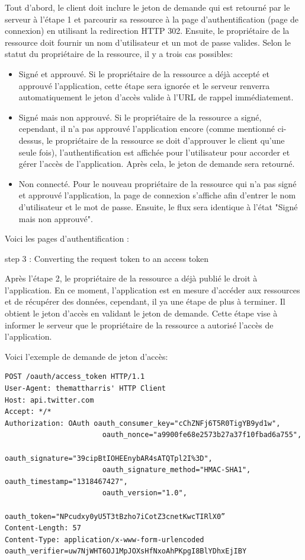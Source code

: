 Tout d'abord, le client doit inclure le jeton de demande qui est retourné par le serveur à l'étape 1 et parcourir sa ressource à la page d'authentification (page de connexion) en utilisant la redirection HTTP 302. Ensuite, le propriétaire de la ressource doit fournir un nom d'utilisateur et un mot de passe valides. Selon le statut du propriétaire de la ressource, il y a trois cas possibles:
\begin{itemize}
\item Signé et approuvé. Si le propriétaire de la ressource a déjà accepté et approuvé l'application, cette étape sera ignorée et le serveur renverra automatiquement le jeton d'accès valide à l'URL de rappel immédiatement.
\item Signé mais non approuvé. Si le propriétaire de la ressource a signé, cependant, il n'a pas approuvé l'application encore (comme mentionné ci-dessus, le propriétaire de la ressource se doit d'approuver le client qu'une seule fois), l'authentification est affichée pour l'utilisateur pour accorder et gérer l'accès de l'application. Après cela, le jeton de demande sera retourné.
\item Non connecté. Pour le nouveau propriétaire de la ressource qui n'a pas signé et approuvé l'application, la page de connexion s'affiche afin d'entrer le nom d'utilisateur et le mot de passe. Ensuite, le flux sera identique à l'état "Signé mais non approuvé".
\end{itemize}
Voici les pages d'authentification : 

step 3 :  Converting the request token to an access token

Après l'étape 2, le propriétaire de la ressource a déjà publié le droit à l'application. En ce moment, l'application est en mesure d'accéder aux ressources et de récupérer des données, cependant, il ya une étape de plus à terminer. Il obtient le jeton d'accès en validant le jeton de demande. Cette étape vise à informer le serveur que le propriétaire de la ressource a autorisé l'accès de l'application.

Voici l'exemple de demande de jeton d'accès:

\begin{verbatim}
POST /oauth/access_token HTTP/1.1
User-Agent: themattharris' HTTP Client
Host: api.twitter.com
Accept: */*
Authorization: OAuth oauth_consumer_key="cChZNFj6T5R0TigYB9yd1w",    
                       oauth_nonce="a9900fe68e2573b27a37f10fbad6a755",  
                       oauth_signature="39cipBtIOHEEnybAR4sATQTpl2I%3D", 
                       oauth_signature_method="HMAC-SHA1", oauth_timestamp="1318467427",
                       oauth_version="1.0", 
                       
oauth_token="NPcudxy0yU5T3tBzho7iCotZ3cnetKwcTIRlX0”
Content-Length: 57
Content-Type: application/x-www-form-urlencoded
oauth_verifier=uw7NjWHT6OJ1MpJOXsHfNxoAhPKpgI8BlYDhxEjIBY
\end{verbatim}

